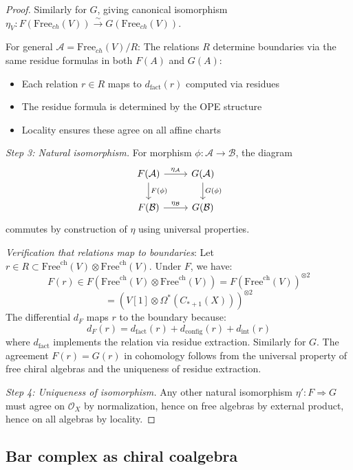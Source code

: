 \begin{proof}
Similarly for $G$, giving canonical isomorphism $\eta_{V}: F(\text{Free}_{ch}(V)) \xrightarrow{\sim} G(\text{Free}_{ch}(V))$.

For general $\mathcal{A} = \text{Free}_{ch}(V)/R$:
The relations $R$ determine boundaries via the same residue formulas in both $F(A)$ and $G(A)$:
\begin{itemize}
\item Each relation $r \in R$ maps to $d_{\text{fact}}(r)$ computed via residues
\item The residue formula is determined by the OPE structure
\item Locality ensures these agree on all affine charts
\end{itemize}

\emph{Step 3: Natural isomorphism.} 
For morphism $\phi: \mathcal{A} \to \mathcal{B}$, the diagram
\[
\begin{tikzcd}
F(\mathcal{A}) \arrow[r, "\eta_\mathcal{A}"] \arrow[d, "F(\phi)"] & G(\mathcal{A}) \arrow[d, "G(\phi)"]\\
F(\mathcal{B}) \arrow[r, "\eta_\mathcal{B}"] & G(\mathcal{B})
\end{tikzcd}
\]
commutes by construction of $\eta$ using universal properties.

\emph{Verification that relations map to boundaries}: Let $r \in R \subset \text{Free}^{\text{ch}}(V) \otimes \text{Free}^{\text{ch}}(V)$.
Under $F$, we have:
\[F(r) \in F(\text{Free}^{\text{ch}}(V) \otimes \text{Free}^{\text{ch}}(V)) = F(\text{Free}^{\text{ch}}(V))^{\otimes 2}\]
\[ = (V[1] \otimes \Omega^*(C_{*+1}(X)))^{\otimes 2}\]
The differential $d_F$ maps $r$ to the boundary because:
\[d_F(r) = d_{\text{fact}}(r) + d_{\text{config}}(r) + d_{\text{int}}(r)\]
where $d_{\text{fact}}$ implements the relation via residue extraction. Similarly for $G$.
The agreement $F(r) = G(r)$ in cohomology follows from the universal property
of free chiral algebras and the uniqueness of residue extraction.

\emph{Step 4: Uniqueness of isomorphism.}
Any other natural isomorphism $\eta': F \Rightarrow G$ must agree on $\mathcal{O}_X$ by normalization,
hence on free algebras by external product, hence on all algebras by locality.
\end{proof}

\subsection{Bar complex as chiral coalgebra}

